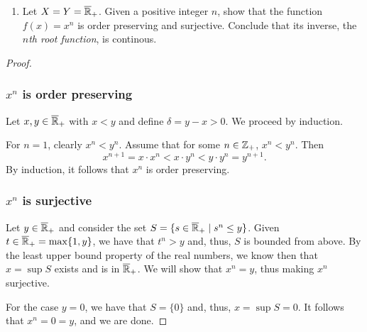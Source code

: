 \begin{solution}
  \begin{enumerate}[label={(\alph*)}, align=left, leftmargin=\parindent, listparindent=\parindent, labelwidth=0pt, itemindent=!]
    \addtocounter{enumi}{1} 
    \item
      Let $X = Y = \overline{\mathbb{R}}_+$.
      Given a positive integer $n$, show that the function $f(x) = x^n$ is order preserving and surjective.
      Conclude that its inverse, the $n$\textit{th root function}, is continous.
  \end{enumerate}
  \begin{proof}~

    \subsubsection*{$x^n$ is order preserving}
    Let $x, y \in \overline{\mathbb{R}}_+$ with $x < y$ and define $\delta = y - x > 0$.
    We proceed by induction.

    For $n = 1$, clearly $x^n < y^n$.
    Assume that for some $n \in \mathbb{Z}_+$, $x^n < y^n$.
    Then
    \begin{equation*}
      x^{n+1} = x \cdot x^n < x \cdot y^n < y \cdot y^n = y^{n+1}.
    \end{equation*}
    By induction, it follows that $x^n$ is order preserving.
    \bigskip

    \subsubsection*{$x^n$ is surjective}
    Let $y \in \overline{\mathbb{R}}_+$ and consider the set $S = \{s \in \overline{\mathbb{R}}_+ \mid s^n \leq y \}$.
    Given $t \in \overline{\mathbb{R}}_+ = \max\{1, y\}$, we have that $t^n > y$ and, thus, $S$ is bounded from above.
    By the least upper bound property of the real numbers, we know then that $x = \sup S$ exists and is in $\overline{\mathbb{R}}_+$.
    We will show that $x^n = y$, thus making $x^n$ surjective.

    For the case $y = 0$, we have that $S = \{0\}$ and, thus, $x = \sup S = 0$.
    It follows that $x^n = 0 = y$, and we are done.


\end{proof}
\end{solution}
